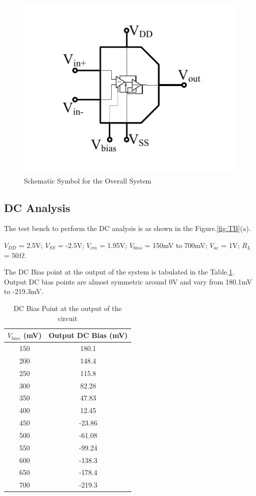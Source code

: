 \begin{figure} [H]
\centering
\includegraphics[scale=1]{Figures/System_Level/System_Symbol.pdf}
\caption{Schematic Symbol for the Overall System}
\label{fig:System_Symbol}
\end{figure}

\subsection{DC Analysis}
The test bench to perform the DC analysis is as shown in the Figure.\ref{fig:TB}(a). 

$V_{DD}$ = 2.5V; $V_{SS}$ = -2.5V; $V_{cm}$ = 1.95V; $V_{bias}$ = 150mV to 700mV;  $V_{ac}$ = 1V; $R_{L}$ = 50$\Omega$.

The DC Bias point at the output of the system is tabulated in the Table.\ref{tab:DC}. Output DC bias points are almost symmetric around 0V and vary from 180.1mV to -219.3mV.
\begin{table} [H]
\centering
\begin{tabular}{@{}cc@{}}
\toprule
$V_{bias}$ (mV)			& Output DC Bias (mV)	\\ \midrule
150					& 180.1  \\
200					& 148.4  \\
250					& 115.8  \\
300					& 82.28	 \\
350					& 47.83	 \\
400					& 12.45	 \\
450					& -23.86 \\
500					& -61.08 \\
550					& -99.24 \\
600					& -138.3 \\
650					& -178.4 \\
700 				& -219.3 \\
\bottomrule
\end{tabular}
\caption{DC Bias Point at the output of the circuit}
\label{tab:DC}
\end{table}

